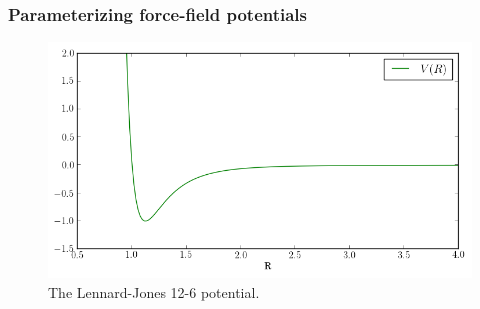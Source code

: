 \begin{frame}
\frametitle{Parameterizing force-field potentials}
 \begin{figure}
 \begin{center}
  \includegraphics[scale=0.5]{../graphics/R_VS_E/LD.png}
  \caption{The Lennard-Jones 12-6 potential.}
  \label{fig:LennardJones}
   \end{center}
\end{figure}
\end{frame}


